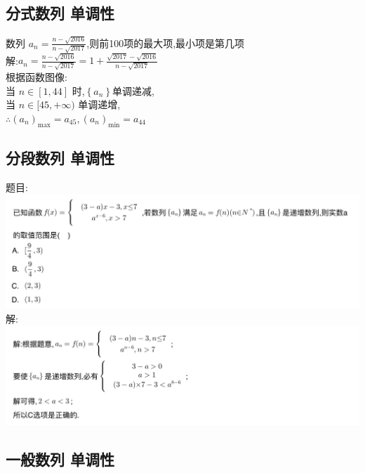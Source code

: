 \documentclass[hyperref, UTF8,11pt,a4paper]{ctexart} %
\begin{document}

\subsection{分式数列 单调性}
{\color{red} 数列 $a_{n}=\frac{n-\sqrt{2016}}{n-\sqrt{2017}}$,则前100项的最大项,最小项是第几项 }\\
解:$a_{n}=\frac{n-\sqrt{2016}}{n-\sqrt{2017}}=1+\frac{\sqrt{2017}-\sqrt{2016}}{n-\sqrt{2017}}$ \\
根据函数图像: \\
当 $n \in[1,44]$ 时,$\left\{a_{n}\right\}$单调递减, \\
当 $n \in[45,+\infty)$ 单调递增, \\
$\therefore \left(a_{n}\right)_{\max }=a_{45},\left(a_{n}\right)_{\min }=a_{44}$


\subsection{分段数列 单调性}
{\color{red}  题目: } \\
\includegraphics[width=500pt]  {pic/shulie/fenduanhanshutimu.jpg} \\
解: \\
\includegraphics[width=500pt]  {pic/shulie/fenduanhanshudaan.jpg} \\


\subsection{一般数列 单调性}
\end{document}
